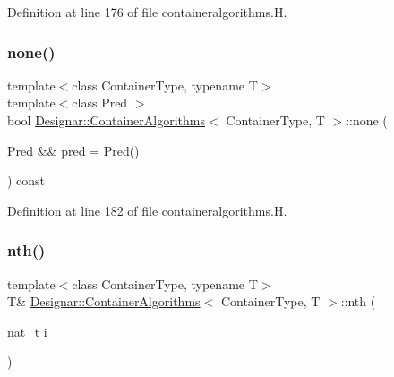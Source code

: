 Definition at line 176 of file containeralgorithms.\+H.

\mbox{\label{class_designar_1_1_container_algorithms_a10a88dd8adee474d79cc412db2f5739c}} 
\subsubsection{\texorpdfstring{none()}{none()}\hspace{0.1cm}{\footnotesize\ttfamily [2/2]}}
{\footnotesize\ttfamily template$<$class Container\+Type, typename T$>$ \\
template$<$class Pred $>$ \\
bool \hyperlink{class_designar_1_1_container_algorithms}{Designar\+::\+Container\+Algorithms}$<$ Container\+Type, T $>$\+::none (\begin{DoxyParamCaption}\item[{Pred \&\&}]{pred = {\ttfamily Pred()} }\end{DoxyParamCaption}) const\hspace{0.3cm}{\ttfamily [inline]}}



Definition at line 182 of file containeralgorithms.\+H.

\mbox{\label{class_designar_1_1_container_algorithms_a519e813f4b2e787dfb7d743910ad3e4b}} 
\subsubsection{\texorpdfstring{nth()}{nth()}\hspace{0.1cm}{\footnotesize\ttfamily [1/2]}}
{\footnotesize\ttfamily template$<$class Container\+Type, typename T$>$ \\
T\& \hyperlink{class_designar_1_1_container_algorithms}{Designar\+::\+Container\+Algorithms}$<$ Container\+Type, T $>$\+::nth (\begin{DoxyParamCaption}\item[{\hyperlink{namespace_designar_aa72662848b9f4815e7bf31a7cf3e33d1}{nat\+\_\+t}}]{i }\end{DoxyParamCaption})\hspace{0.3cm}{\ttfamily [inline]}}



